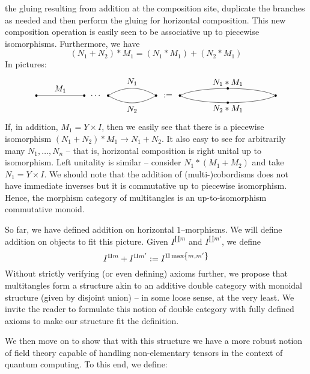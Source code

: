 \documentclass{amsart}
\renewcommand{\to}[1][]{\stackrel{#1}{\longrightarrow}}
\newcommand{\curly}[1]{\left\{ #1 \right\}}
\newcommand{\set}[2][]{\ifthenelse{\equal{#1}{}}
                                  {\curly{#2}}
                                  {\curly{#1\ \textbf{:}\ #2}}}
\newcommand{\vertinnersep}{1pt}
\newcommand{\colvert}[3]{
\node[circle, fill, inner sep=\vertinnersep, #1] at (#2) (#3) {};
}
\newcommand{\lblvert}[3]{
\node at (#1) (#2) {#3};
}
\numberwithin{thm}{section}
\theoremstyle{definition}
\begin{document}
the gluing resulting from addition at the composition site, duplicate the
branches as needed and then perform the gluing for horizontal composition. This
new composition operation is easily seen to be associative up to piecewise
isomorphisms. Furthermore, we have
\[
  (N_1 + N_2) * M_1 = (N_1 * M_1) + (N_2 * M_1)
\]
In pictures:
\[\begin{tikzpicture}
\colvert{black}{1, 0}{X}
\colvert{black}{3, 0}{Y}
\lblvert{3.5, 0}{glue}{$\cdots$}
\colvert{black}{4, 0}{YY}
\colvert{black}{6, 0}{Z}
\path
  (X)  edge   node[above]{$M_1$}   (Y)
  (YY) edge[bend left]   node[above]{$N_1$}  (Z)
  (YY) edge[bend right]  node[below]{$N_2$} (Z)
  ;
\lblvert{6.5, 0}{equals}{$:=$}
\colvert{black}{7, 0}{XX}
\colvert{black}{9, 0.30}{YYY}
\colvert{black}{9, -0.30}{YYYY}
\colvert{black}{11, 0}{ZZ}
\draw (XX) .. controls (7.5, 0.25) and (8.5, 0.30) .. (YYY);
\draw (YYY) .. controls (9.5, 0.30) and (10.5, 0.25) .. (ZZ);
\draw (XX) .. controls (7.5, -0.25) and (8.5, -0.30) .. (YYYY);
\draw (YYYY) .. controls (9.5, -0.30) and (10.5, -0.25) .. (ZZ);

\lblvert{9, 0.55}{NM}{$N_1 * M_1$}
\lblvert{9, -0.55}{NNMM}{$N_2 * M_1$}
\end{tikzpicture}\]
If, in addition, $M_1 = Y \times I$, then we easily see that there is a
piecewise isomorphism $(N_1 + N_2) * M_1 \to N_1 + N_2$. It also easy to see for
arbitrarily many $N_1, \dots, N_n$ -- that is, horizontal
composition is right unital up to isomorphism. Left unitality is similar --
consider $N_1 * (M_1 + M_2)$ and take $N_1 = Y \times I$. We should note that
the addition of (multi-)cobordisms does not have immediate inverses but it is
commutative up to piecewise isomorphism. Hence, the morphism category of
multitangles is an up-to-isomorphism commutative monoid.

So far, we have defined addition on horizontal $1$--morphisms. We will define
addition on objects to fit this picture. Given $I^{\amalg m}$ and
$I^{\amalg m'}$, we define
\[
  I^{\amalg m} + I^{\amalg m'} := I^{\amalg \max\set{m, m'}}
\]
Without strictly verifying (or even defining) axioms further, we propose that
multitangles form a structure akin to an additive double category with
monoidal structure (given by disjoint union) -- in some loose sense, at the very
least. We invite the reader to formulate this notion of double category with
fully defined axioms to make our structure fit the definition.

We then move on to show that with this structure we have a more robust notion of
field theory capable of handling non-elementary tensors in the context of
quantum computing. To this end, we define:
\end{document}

